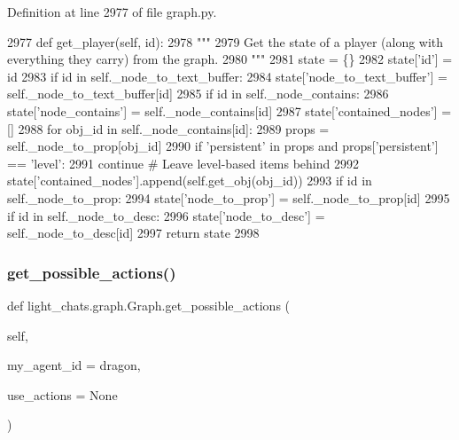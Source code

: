 Definition at line 2977 of file graph.\+py.


\begin{DoxyCode}
2977     \textcolor{keyword}{def }get\_player(self, id):
2978         \textcolor{stringliteral}{"""}
2979 \textcolor{stringliteral}{        Get the state of a player (along with everything they carry) from the graph.}
2980 \textcolor{stringliteral}{        """}
2981         state = \{\}
2982         state[\textcolor{stringliteral}{'id'}] = id
2983         \textcolor{keywordflow}{if} id \textcolor{keywordflow}{in} self.\_node\_to\_text\_buffer:
2984             state[\textcolor{stringliteral}{'node\_to\_text\_buffer'}] = self.\_node\_to\_text\_buffer[id]
2985         \textcolor{keywordflow}{if} id \textcolor{keywordflow}{in} self.\_node\_contains:
2986             state[\textcolor{stringliteral}{'node\_contains'}] = self.\_node\_contains[id]
2987             state[\textcolor{stringliteral}{'contained\_nodes'}] = []
2988             \textcolor{keywordflow}{for} obj\_id \textcolor{keywordflow}{in} self.\_node\_contains[id]:
2989                 props = self.\_node\_to\_prop[obj\_id]
2990                 \textcolor{keywordflow}{if} \textcolor{stringliteral}{'persistent'} \textcolor{keywordflow}{in} props \textcolor{keywordflow}{and} props[\textcolor{stringliteral}{'persistent'}] == \textcolor{stringliteral}{'level'}:
2991                     \textcolor{keywordflow}{continue}  \textcolor{comment}{# Leave level-based items behind}
2992                 state[\textcolor{stringliteral}{'contained\_nodes'}].append(self.get\_obj(obj\_id))
2993         \textcolor{keywordflow}{if} id \textcolor{keywordflow}{in} self.\_node\_to\_prop:
2994             state[\textcolor{stringliteral}{'node\_to\_prop'}] = self.\_node\_to\_prop[id]
2995         \textcolor{keywordflow}{if} id \textcolor{keywordflow}{in} self.\_node\_to\_desc:
2996             state[\textcolor{stringliteral}{'node\_to\_desc'}] = self.\_node\_to\_desc[id]
2997         \textcolor{keywordflow}{return} state
2998 
\end{DoxyCode}
\mbox{\label{classlight__chats_1_1graph_1_1Graph_a40e6753f63c9c8d31dd57a5c38aaac3c}} 
\subsubsection{\texorpdfstring{get\+\_\+possible\+\_\+actions()}{get\_possible\_actions()}}
{\footnotesize\ttfamily def light\+\_\+chats.\+graph.\+Graph.\+get\+\_\+possible\+\_\+actions (\begin{DoxyParamCaption}\item[{}]{self,  }\item[{}]{my\+\_\+agent\+\_\+id = {\ttfamily \textquotesingle{}dragon\textquotesingle{}},  }\item[{}]{use\+\_\+actions = {\ttfamily None} }\end{DoxyParamCaption})}

